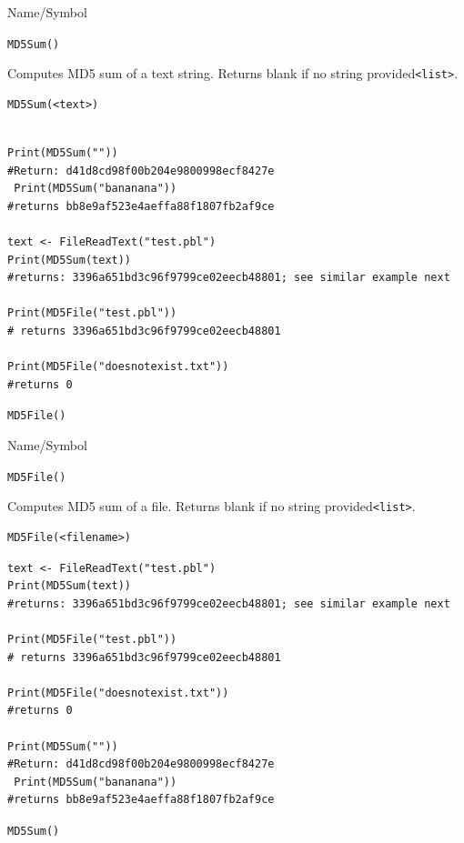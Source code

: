 \begin{desc}{Name/Symbol}
\item[Name/Symbol]	\verb+MD5Sum()+            

\item[Description] Computes MD5 sum of a text string.  Returns blank if no string provided\verb+<list>+.

\item[Usage]		
\begin{verbatim}
MD5Sum(<text>)
\end{verbatim}

\item[Example]	
\begin{verbatim} 

Print(MD5Sum(""))
#Return: d41d8cd98f00b204e9800998ecf8427e
 Print(MD5Sum("bananana"))
#returns bb8e9af523e4aeffa88f1807fb2af9ce

text <- FileReadText("test.pbl")
Print(MD5Sum(text))  
#returns: 3396a651bd3c96f9799ce02eecb48801; see similar example next

Print(MD5File("test.pbl"))
# returns 3396a651bd3c96f9799ce02eecb48801

Print(MD5File("doesnotexist.txt"))
#returns 0

\end{verbatim}
\item[See Also]	\verb+MD5File()+
\end{desc}



\begin{desc}{Name/Symbol}
\item[Name/Symbol]	\verb+MD5File()+            

\item[Description] Computes MD5 sum of a file.  Returns blank if no string provided\verb+<list>+.

\item[Usage]		
\begin{verbatim}
MD5File(<filename>)
\end{verbatim}

\item[Example]	
\begin{verbatim} 
text <- FileReadText("test.pbl")
Print(MD5Sum(text))  
#returns: 3396a651bd3c96f9799ce02eecb48801; see similar example next

Print(MD5File("test.pbl"))
# returns 3396a651bd3c96f9799ce02eecb48801

Print(MD5File("doesnotexist.txt"))
#returns 0

Print(MD5Sum(""))
#Return: d41d8cd98f00b204e9800998ecf8427e
 Print(MD5Sum("bananana"))
#returns bb8e9af523e4aeffa88f1807fb2af9ce
\end{verbatim}
\item[See Also]	\verb+MD5Sum()+
\end{desc}



